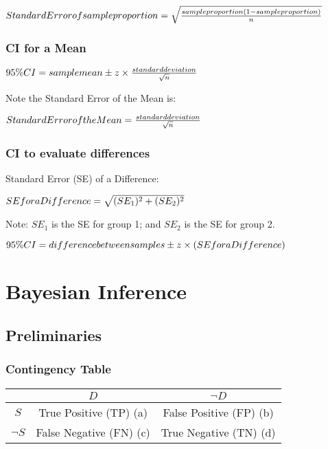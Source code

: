 \documentclass[
]{book}
\begin{document}
\(Standard \space Error \space of \space sample \space proportion=\sqrt{\frac{sample \space proportion(1-sample \space proportion)}{n}}\)

\hypertarget{ci-for-a-mean}{%
\subsection{CI for a Mean}\label{ci-for-a-mean}}

\(95\%CI=sample \space mean \pm z \times \frac{standard \space deviation}{\sqrt{n}}\)

Note the Standard Error of the Mean is:

\(Standard \space Error \space of \space the \space Mean=\frac{standard \space deviation}{\sqrt{n}}\)

\hypertarget{ci-to-evaluate-differences}{%
\subsection{CI to evaluate differences}\label{ci-to-evaluate-differences}}

Standard Error (SE) of a Difference:

\(SE \space for \space a \space Difference=\sqrt{(SE_1)^2 +(SE_2)^2}\)

Note: \(SE_1\) is the SE for group 1; and \(SE_2\) is the SE for group 2.

\(95\%CI=difference \space between \space samples \pm z \times (SE \space for \space a \space Difference)\)

\hypertarget{bayesian-inference}{%
\chapter{Bayesian Inference}\label{bayesian-inference}}

\hypertarget{preliminaries}{%
\section{Preliminaries}\label{preliminaries}}

\hypertarget{contingency-table}{%
\subsection{Contingency Table}\label{contingency-table}}

\begin{longtable}[]{@{}ccc@{}}
\toprule
& \(D\) & \(\neg D\) \\
\midrule
\endhead
\(S\) & True Positive (TP) (a) & False Positive (FP) (b) \\
\(\neg S\) & False Negative (FN) (c) & True Negative (TN) (d) \\
\bottomrule
\end{longtable}
\end{document}
